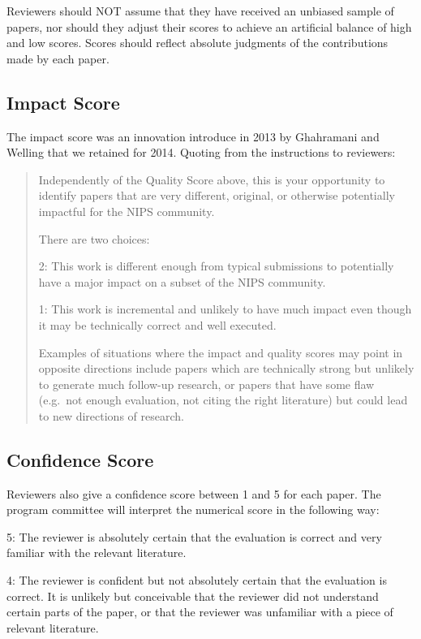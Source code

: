 Reviewers should NOT assume that they have received an unbiased sample
of papers, nor should they adjust their scores to achieve an artificial
balance of high and low scores. Scores should reflect absolute judgments
of the contributions made by each paper.

\hypertarget{impact-score}{%
\subsection{Impact Score}\label{impact-score}}

The impact score was an innovation introduce in 2013 by Ghahramani and
Welling that we retained for 2014. Quoting from the instructions to
reviewers:

\begin{quote}
Independently of the Quality Score above, this is your opportunity to
identify papers that are very different, original, or otherwise
potentially impactful for the NIPS community.

There are two choices:

2: This work is different enough from typical submissions to potentially
have a major impact on a subset of the NIPS community.

1: This work is incremental and unlikely to have much impact even though
it may be technically correct and well executed.

Examples of situations where the impact and quality scores may point in
opposite directions include papers which are technically strong but
unlikely to generate much follow-up research, or papers that have some
flaw (e.g.~not enough evaluation, not citing the right literature) but
could lead to new directions of research.
\end{quote}

\hypertarget{confidence-score}{%
\subsection{Confidence Score}\label{confidence-score}}

Reviewers also give a confidence score between 1 and 5 for each paper.
The program committee will interpret the numerical score in the
following way:

5: The reviewer is absolutely certain that the evaluation is correct and
very familiar with the relevant literature.

4: The reviewer is confident but not absolutely certain that the
evaluation is correct. It is unlikely but conceivable that the reviewer
did not understand certain parts of the paper, or that the reviewer was
unfamiliar with a piece of relevant literature.

